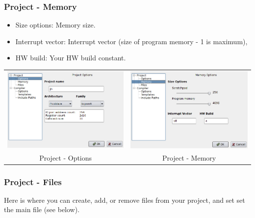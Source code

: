         \subsubsection{Project - Memory}
            \begin{itemize}
                \item Size options: Memory size.
                \item Interrupt vector: Interrupt vector (size of program memory - 1 is maximum),
                \item HW build: Your HW build constant.
            \end{itemize}
            \begin{table}[h!]
                \begin{tabular}{cc}
                    \includegraphics[width=.5\textwidth]{img/config2.png}
                        &
                    \includegraphics[width=.5\textwidth]{img/config1.png}
                        \\
                    Project - Options & Project - Memory
                \end{tabular}
            \end{table}

        \subsubsection{Project - Files}
            Here is where you can create, add, or remove files from your project, and set set the main file (see below).

